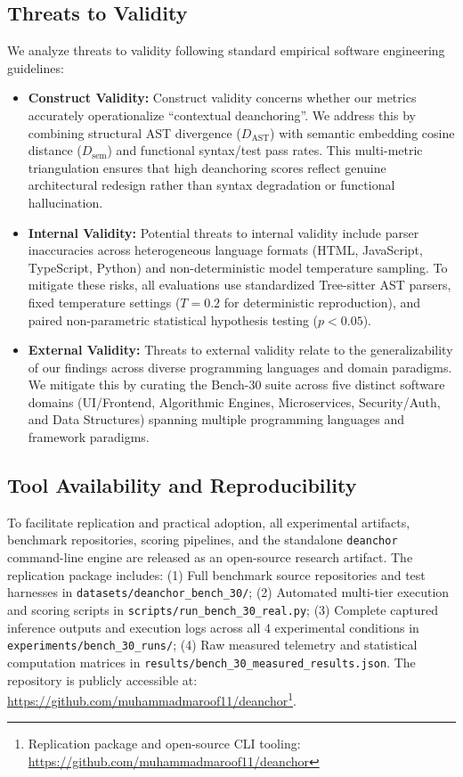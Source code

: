 \documentclass[10pt,journal,compsoc]{IEEEtran}
\begin{document}
\subsection{Threats to Validity}
We analyze threats to validity following standard empirical software engineering guidelines:
\begin{itemize}
    \item \textbf{Construct Validity:} Construct validity concerns whether our metrics accurately operationalize ``contextual deanchoring''. We address this by combining structural AST divergence ($D_{\text{AST}}$) with semantic embedding cosine distance ($D_{\text{sem}}$) and functional syntax/test pass rates. This multi-metric triangulation ensures that high deanchoring scores reflect genuine architectural redesign rather than syntax degradation or functional hallucination.
    \item \textbf{Internal Validity:} Potential threats to internal validity include parser inaccuracies across heterogeneous language formats (HTML, JavaScript, TypeScript, Python) and non-deterministic model temperature sampling. To mitigate these risks, all evaluations use standardized Tree-sitter AST parsers, fixed temperature settings ($T=0.2$ for deterministic reproduction), and paired non-parametric statistical hypothesis testing ($p < 0.05$).
    \item \textbf{External Validity:} Threats to external validity relate to the generalizability of our findings across diverse programming languages and domain paradigms. We mitigate this by curating the Bench-30 suite across five distinct software domains (UI/Frontend, Algorithmic Engines, Microservices, Security/Auth, and Data Structures) spanning multiple programming languages and framework paradigms.
\end{itemize}

\subsection{Tool Availability and Reproducibility}
To facilitate replication and practical adoption, all experimental artifacts, benchmark repositories, scoring pipelines, and the standalone \texttt{deanchor} command-line engine are released as an open-source research artifact. The replication package includes:
(1) Full benchmark source repositories and test harnesses in \texttt{datasets/deanchor\_bench\_30/};
(2) Automated multi-tier execution and scoring scripts in \texttt{scripts/run\_bench\_30\_real.py};
(3) Complete captured inference outputs and execution logs across all 4 experimental conditions in \texttt{experiments/bench\_30\_runs/};
(4) Raw measured telemetry and statistical computation matrices in \texttt{results/bench\_30\_measured\_results.json}.
The repository is publicly accessible at: \url{https://github.com/muhammadmaroof11/deanchor}\footnote{Replication package and open-source CLI tooling: \url{https://github.com/muhammadmaroof11/deanchor}}.
\end{document}
